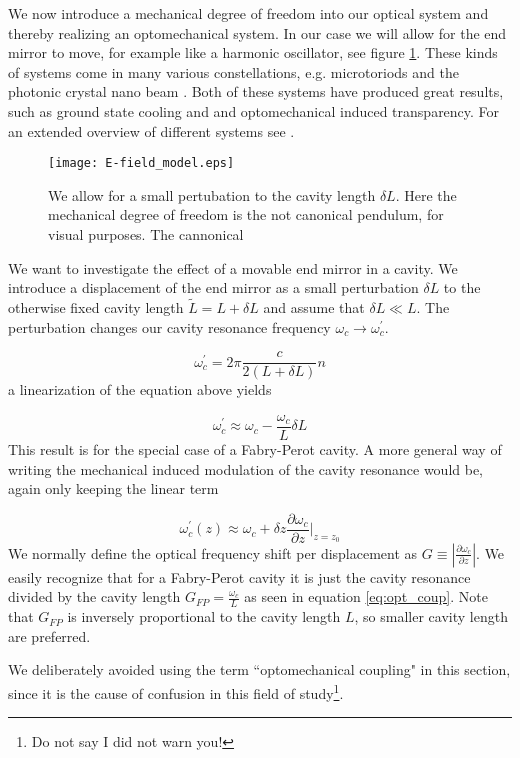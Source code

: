 We now introduce a mechanical degree of freedom into our optical system and thereby realizing  an optomechanical system. In our case we will allow for the end mirror to move, for example like a harmonic oscillator, see figure \ref{fig:E-field_model_moving}. These kinds of systems come in many various constellations, e.g. microtoriods \cite{weis2010} and the photonic crystal nano beam \cite{chan2011}. Both of these systems have produced great results, such as ground state cooling and and optomechanical induced transparency. For an extended overview of different systems see \cite{aspelmeyer2014}.

\begin{figure}[H]
\centering
\texttt{[image: E-field\_model.eps]}
\caption{We allow for a small pertubation to the cavity length $\delta L$. Here the mechanical degree of freedom is the not canonical pendulum, for visual purposes. The cannonical}
\label{fig:E-field_model_moving}
\end{figure}

We want to investigate the effect of a movable end mirror in a cavity. We introduce a displacement of the end mirror as a small perturbation $\delta L$ to the otherwise fixed cavity length $\tilde{L} = L + \delta L$ and assume that $\delta L \ll L$. The perturbation changes our cavity resonance frequency $\omega_c \rightarrow \omega_c^\prime$.

\begin{equation}
\omega_c^\prime = 2\pi\frac{c}{2\left( L + \delta L \right)}n
\end{equation}
\noindent
a linearization of the equation above yields

\begin{equation}
\omega_c^\prime \approx \omega_c - \frac{\omega_c}{L}\delta L
\label{eq:opt_coup}
\end{equation}
\noindent
This result is for the special case of a Fabry-Perot cavity. A more general way of writing the mechanical induced modulation of the cavity resonance would be, again only keeping the linear term

\begin{equation}
\omega_c^\prime(z) \approx \omega_c + \delta z\frac{\partial\omega_c}{\partial z}\bigg|_{z = z_0}
\end{equation}
\noindent
We normally define the optical frequency shift per displacement as $G \equiv \left|\frac{\partial\omega_c}{\partial z}\right|$. We easily recognize that for a Fabry-Perot cavity it is just the cavity resonance divided by the cavity length $G_{FP} = \frac{\omega_c}{L}$ as seen in equation \eqref{eq:opt_coup}. Note that $G_{FP}$ is inversely proportional to the cavity length $L$, so smaller cavity length are preferred.

We deliberately avoided using the term ``optomechanical coupling" in this section, since it is the cause of confusion in this field of study\footnote{Do not say I did not warn you!}.